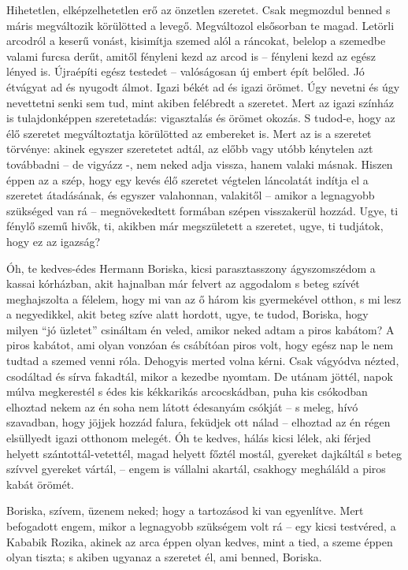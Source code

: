 \documentclass{IEEEtran}
\begin{document}
Hihetetlen, elképzelhetetlen erő az önzetlen szeretet. Csak megmozdul benned s
máris megváltozik körülötted a levegő. Megváltozol elsősorban te magad.
Letörli arcodról a keserű vonást, kisimítja szemed alól a ráncokat, belelop a
szemedbe valami furcsa derűt, amitől fényleni kezd az arcod is – fényleni kezd
az egész lényed is. Újraépíti egész testedet – valóságosan új embert épít
belőled. Jó étvágyat ad és nyugodt álmot. Igazi békét ad és igazi örömet. Úgy
nevetni és úgy nevettetni senki sem tud, mint akiben felébredt a szeretet.
Mert az igazi színház is tulajdonképpen szeretetadás: vigasztalás és örömet
okozás.
S tudod-e, hogy az élő szeretet megváltoztatja körülötted az embereket is.
Mert az is a szeretet törvénye: akinek egyszer szeretetet adtál, az előbb vagy
utóbb kénytelen azt továbbadni – de vigyázz -, nem neked adja vissza, hanem
valaki másnak. Hiszen éppen az a szép, hogy egy kevés élő szeretet végtelen
láncolatát indítja el a szeretet átadásának, és egyszer valahonnan, valakitől
– amikor a legnagyobb szükséged van rá – megnövekedtett formában szépen
visszakerül hozzád.
Ugye, ti fénylő szemű hivők, ti, akikben már megszületett a szeretet, ugye, ti
tudjátok, hogy ez az igazság?

Óh, te kedves-édes Hermann Boriska, kicsi parasztasszony ágyszomszédom a
kassai kórházban, akit hajnalban már felvert az aggodalom s beteg szívét
meghajszolta a félelem, hogy mi van az ő három kis gyermekével otthon, s mi
lesz a negyedikkel, akit beteg szíve alatt hordott, ugye, te tudod, Boriska,
hogy milyen “jó üzletet” csináltam én veled, amikor neked adtam a piros
kabátom? A piros kabátot, ami olyan vonzóan és csábítóan piros volt, hogy
egész nap le nem tudtad a szemed venni róla. Dehogyis merted volna kérni. Csak
vágyódva nézted, csodáltad és sírva fakadtál, mikor a kezedbe nyomtam.
De utánam jöttél, napok múlva megkerestél s édes kis kékkarikás arcocskádban,
puha kis csókodban elhoztad nekem az én soha nem látott édesanyám csókját – s
meleg, hívó szavadban, hogy jöjjek hozzád falura, feküdjek ott nálad –
elhoztad az én régen elsüllyedt igazi otthonom melegét. Óh te kedves, hálás
kicsi lélek, aki férjed helyett szántottál-vetettél, magad helyett főztél
mostál, gyereket dajkáltál s beteg szívvel gyereket vártál, – engem is
vállalni akartál, csakhogy megháláld a piros kabát örömét.

Boriska, szívem, üzenem neked; hogy a tartozásod ki van egyenlítve. Mert
befogadott engem, mikor a legnagyobb szükségem volt rá – egy kicsi testvéred,
a Kababik Rozika, akinek az arca éppen olyan kedves, mint a tied, a szeme
éppen olyan tiszta; s akiben ugyanaz a szeretet él, ami benned, Boriska.
\end{document}
